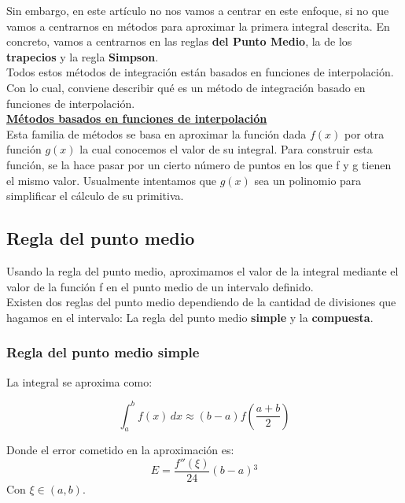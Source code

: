 \documentclass{article}
\begin{document}
Sin embargo, en este artículo no nos vamos a centrar en este enfoque, si no que vamos a centrarnos en métodos para aproximar la primera integral descrita.
En concreto, vamos a centrarnos en las reglas \textbf{del Punto Medio}, la de los \textbf{trapecios} y la regla \textbf{Simpson}. \\

Todos estos métodos de integración están basados en funciones de interpolación.
Con lo cual, conviene describir qué es un método de integración basado en funciones de interpolación.\\

\underline{\textbf{Métodos basados en funciones de interpolación}} \\

Esta familia de métodos se basa en aproximar la función dada $f(x)$ por otra función $g(x)$ la cual conocemos el valor de su integral. Para  construir esta función, se la hace pasar por un cierto número de puntos en los que f y g tienen el mismo valor. Usualmente intentamos que $g(x)$ sea un polinomio para simplificar el cálculo de su primitiva.

	\subsection{Regla del punto medio}

		Usando la regla del punto medio, aproximamos el valor de la integral mediante el valor de la función f en el punto medio de un intervalo definido. \\
	
		Existen dos reglas del punto medio dependiendo de la cantidad de divisiones que hagamos en el intervalo: La regla del punto medio \textbf{simple} y la \textbf{compuesta}.
		
			\subsubsection{Regla del punto medio simple}
			
			La integral se aproxima como:
			
			\begin{equation}
				\int_{a}^{b} f(x) \,dx \approx (b-a)f\left(\frac{a+b}{2}\right)  
			\end{equation}
			
			Donde el error cometido en la aproximación es:
			\begin{equation}
				E = \frac{f''(\xi)}{24} (b - a){^3}
			\end{equation}
			Con $\xi \in (a,b)$. \\
			
\end{document}

